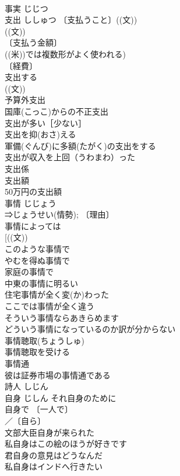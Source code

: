 \documentclass[8pt]{extreport}
\begin{document}
\begin{CJK}{UTF8}{min}
\\	事実	じじつ	
\\	支出	ししゅつ	〔支払うこと〕((文)) 
\\	((文)) 
\\	〔支払う金額〕
\\	((米))では複数形がよく使われる) 
\\	〔経費〕
\\	支出する 
\\	((文)) 
\\	予算外支出 
\\	国庫(こっこ)からの不正支出 
\\	支出が多い［少ない］ 
\\	支出を抑(おさ)える 
\\	軍備(ぐんび)に多額(たがく)の支出をする 
\\	支出が収入を上回（うわまわ）った 
\\	支出係 
\\	支出額 
\\	50万円の支出額 
\\	事情	じじょう	
\\	⇒じょうせい(情勢); 〔理由〕
\\	事情によっては 
\\	[((文)) 
\\	このような事情で 
\\	やむを得ぬ事情で 
\\	家庭の事情で 
\\	中東の事情に明るい 
\\	住宅事情が全く変(か)わった 
\\	ここでは事情が全く違う 
\\	そういう事情ならあきらめます 
\\	どういう事情になっているのか訳が分からない 
\\	事情聴取(ちょうしゅ) 
\\	事情聴取を受ける 
\\	事情通　
\\	彼は証券市場の事情通である 
\\	詩人	しじん	
\\	自身	じしん	それ自身のために 
\\	自身で 〔一人で〕
\\	／〔自ら〕
\\	文部大臣自身が来られた 
\\	私自身はこの絵のほうが好きです 
\\	君自身の意見はどうなんだ 
\\	私自身はインドへ行きたい 

\end{CJK}
\end{document}
